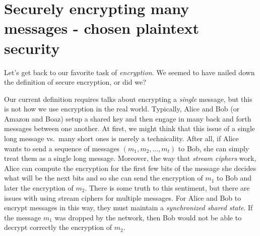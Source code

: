 \hypertarget{prfpracticerem}{}

\section{Securely encrypting many messages - chosen plaintext
security}\label{Securely-encrypting-many-}

Let's get back to our favorite task of \emph{encryption}. We seemed to
have nailed down the definition of secure encryption, or did we?


Our current definition requires talks about encrypting a \emph{single}
message, but this is not how we use encryption in the real world.
Typically, Alice and Bob (or Amazon and Boaz) setup a shared key and
then engage in many back and forth messages between one another. At
first, we might think that this issue of a single long message vs.~many
short ones is merely a technicality. After all, if Alice wants to send a
sequence of messages \((m_1,m_2,\ldots,m_t)\) to Bob, she can simply
treat them as a single long message. Moreover, the way that \emph{stream
ciphers} work, Alice can compute the encryption for the first few bits
of the message she decides what will be the next bits and so she can
send the encryption of \(m_1\) to Bob and later the encryption of
\(m_2\). There is some truth to this sentiment, but there are issues
with using stream ciphers for multiple messages. For Alice and Bob to
encrypt messages in this way, they must maintain a \emph{synchronized
shared state}. If the message \(m_1\) was dropped by the network, then
Bob would not be able to decrypt correctly the encryption of \(m_2\).

